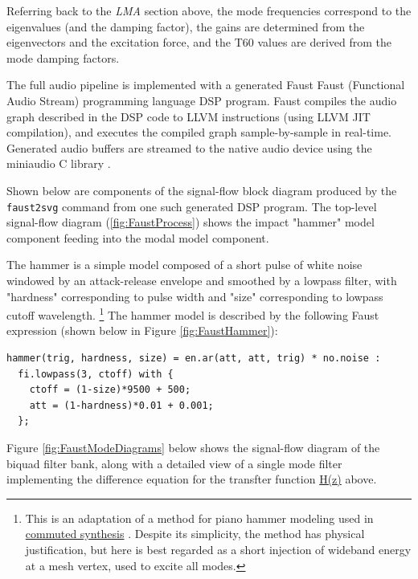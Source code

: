 \documentclass[12pt]{article}
\begin{document}
Referring back to the \textit{LMA} section above, the mode frequencies correspond to the eigenvalues (and the damping factor), the gains are determined from the eigenvectors and the excitation force, and the T60 values are derived from the mode damping factors.

The full audio pipeline is implemented with a generated Faust Faust (Functional Audio Stream) programming language \cite{faust} DSP program.
Faust compiles the audio graph described in the DSP code to LLVM instructions (using LLVM JIT compilation), and executes the compiled graph sample-by-sample in real-time.
Generated audio buffers are streamed to the native audio device using the miniaudio C library \cite{miniaudio}.

Shown below are components of the signal-flow block diagram produced by the \verb|faust2svg| command from one such generated DSP program.
The top-level signal-flow diagram (\ref{fig:FaustProcess}) shows the impact "hammer" model component feeding into the modal model component.

The hammer is a simple model composed of a short pulse of white noise windowed by an attack-release envelope and smoothed by a lowpass filter, with "hardness" corresponding to pulse width and "size" corresponding to lowpass cutoff wavelength.
\footnote{This is an adaptation of a method for piano hammer modeling used in \href{https://ccrma.stanford.edu/~jos/pasp/Commuted_Piano_Synthesis.html}{commuted synthesis} \cite{smith_pasp}.
Despite its simplicity, the method has physical justification, but here is best regarded as a short injection of wideband energy at a mesh vertex, used to excite all modes.}
The hammer model is described by the following Faust expression (shown below in Figure \ref{fig:FaustHammer}):

\newpage

\begin{small}
\begin{verbatim}
hammer(trig, hardness, size) = en.ar(att, att, trig) * no.noise :
  fi.lowpass(3, ctoff) with {
    ctoff = (1-size)*9500 + 500;
    att = (1-hardness)*0.01 + 0.001;
  };
\end{verbatim}
\end{small}

Figure \ref{fig:FaustModeDiagrams} below shows the signal-flow diagram of the biquad filter bank, along with a detailed view of a single mode filter implementing the difference equation for the transfter function \hyperref[eq:1]{H(z)} above.
\end{document}
